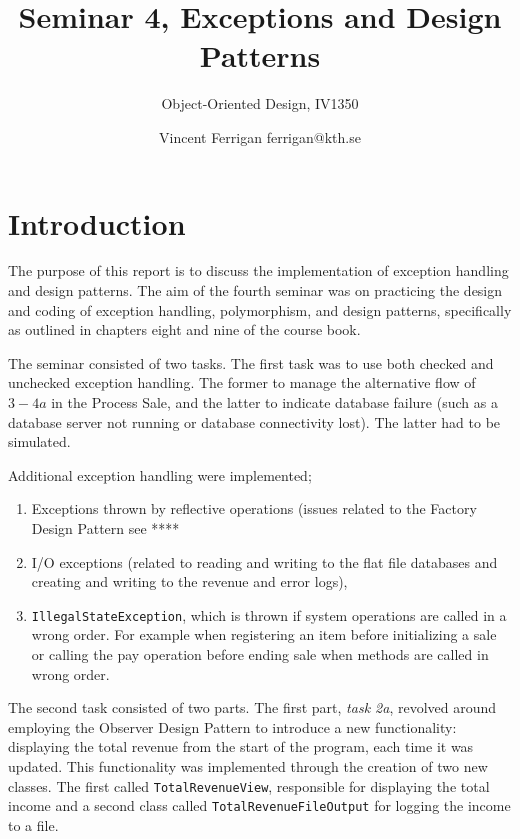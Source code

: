 \documentclass[a4paper]{scrreprt}
\title{Seminar 4, Exceptions and Design Patterns}
\subtitle{Object-Oriented Design, IV1350}
\author{Vincent Ferrigan ferrigan@kth.se}
\begin{document}
\maketitle

\tableofcontents %

\chapter{Introduction}
The purpose of this report is to discuss the implementation of exception handling
and design patterns.
The aim of the fourth seminar was on practicing the design
and coding of exception handling, polymorphism, and design patterns,
specifically as outlined in chapters eight and nine of the course book.

The seminar consisted of two tasks.
The first task was to use both checked and
unchecked exception handling.
The former to manage the alternative flow of $3-4a$
in the Process Sale, and the latter to indicate database failure (such as a
database server not running or database connectivity lost).
The latter had to
be simulated.

Additional exception handling were implemented;
\begin{enumerate}
    \item Exceptions thrown by reflective operations (issues related to the Factory Design Pattern see ****%
    \item I/O exceptions (related to reading and writing to the flat file databases and creating and writing to the revenue and error logs),
    \item \texttt{IllegalStateException}, which is thrown if system operations are called in a wrong order.
    For example when registering an item before initializing a sale or calling the pay operation before ending sale
    when methods are called in wrong order.
\end{enumerate}

The second task consisted of two parts.
The first part, \emph{task 2a}, revolved
around employing the Observer Design Pattern to introduce a new functionality:
displaying the total revenue from the start of the program, each time it was
updated.
This functionality was implemented through the creation of two new
classes.
The first called \texttt{TotalRevenueView}, responsible for displaying the
total income and a second class called \texttt{TotalRevenueFileOutput} for logging the
income to a file.
\end{document}
